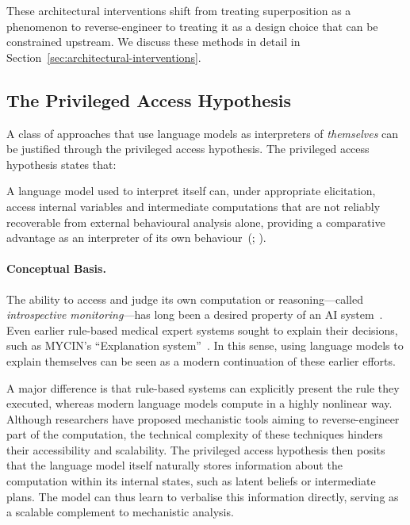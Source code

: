 These architectural interventions shift from treating superposition as a phenomenon to reverse-engineer to treating it as a design choice that can be constrained upstream. We discuss these methods in detail in Section~\ref{sec:architectural-interventions}.

\subsection{The Privileged Access Hypothesis} 
\label{subsec:privileged-access}
A class of approaches that use language models as interpreters of \textit{themselves} can be justified through the privileged access hypothesis. The privileged access hypothesis states that:
\begin{definitionbox}
A language model used to interpret itself can, under appropriate elicitation, access internal variables and intermediate computations that are not reliably recoverable from external behavioural analysis alone, providing a comparative advantage as an interpreter of its own behaviour~(; ).
\end{definitionbox}

\paragraph{Conceptual Basis.} The ability to access and judge its own computation or reasoning---called \emph{introspective monitoring}---has long been a desired property of an AI system~. Even earlier rule-based medical expert systems sought to explain their decisions, such as MYCIN's ``Explanation system''~. In this sense, using language models to explain themselves can be seen as a modern continuation of these earlier efforts.

A major difference is that rule-based systems can explicitly present the rule they executed, whereas modern language models compute in a highly nonlinear way. Although researchers have proposed mechanistic tools aiming to reverse-engineer part of the computation, the technical complexity of these techniques hinders their accessibility and scalability. The privileged access hypothesis then posits that the language model itself naturally stores information about the computation within its internal states, such as latent beliefs or intermediate plans. The model can thus learn to verbalise this information directly, serving as a scalable complement to mechanistic analysis.

